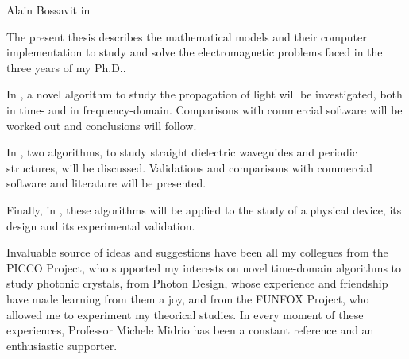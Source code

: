 \begin{preface}

  
  \Cite{Before solving a problem, we must first of all set it properly. We
    have a physical situation on the one hand, with a description
    (dimensions, values of physical parameters) and a query about this
    situation, coming from some interested party. The task of our party
    (the would-be Mathematical Modeler, Computer Scientist and Expert in
    the Manipulation of Electromagnetic Software Systems) is to formulate
    a relevant mathematical problem, liable to approximate solution
    (usually with a computer), and this solution should be in such final
    form that the query is answered, possibly with some error or
    uncertainty, but within a controlled and predictable
    margin. Mathematical modelling is the process by which such a
    correspondence between a physical situation and a mathematical problem
    is established.}{Alain Bossavit in \cite[page 32]{bossavit_computational}}

  The present thesis describes the mathematical models and their computer
  implementation to study and solve the electromagnetic problems faced in the
  three years of my Ph.D..

  In , a novel algorithm to study the
  propagation of light will be investigated, both in time- and in
  frequency-domain. Comparisons with commercial software will be worked
  out and conclusions will follow.

  In , two algorithms, to study straight
  dielectric waveguides and periodic structures, will be
  discussed. Validations and comparisons with commercial software and
  literature will be presented.

  Finally, in , these algorithms will be applied
  to the study of a physical device, its design and its experimental
  validation.

  Invaluable source of ideas and suggestions have been all my collegues
  from the PICCO Project, who supported my interests on novel
  time-domain algorithms to study photonic crystals, from Photon Design,
  whose experience and friendship have made learning from them a joy,
  and from the FUNFOX Project, who allowed me to experiment my theorical
  studies. In every moment of these experiences, Professor Michele
  Midrio has been a constant reference and an enthusiastic supporter.


\end{preface}


